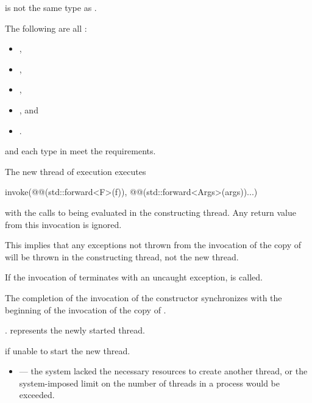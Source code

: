 \begin{itemdescr}
\pnum
\constraints
{} is not the same type as .

\pnum
\mandates
The following are all :
\begin{itemize}
\item {},
\item {},
\item {},
\item {}, and
\item {}.
\end{itemize}

\pnum
\expects
{} and each type in  meet the
 requirements.

\pnum
\effects
The new thread of execution executes
\begin{codeblock}
invoke(@@(std::forward<F>(f)), @@(std::forward<Args>(args))...)
\end{codeblock}
with the calls to
 being evaluated in the constructing thread.
Any return value from this invocation is ignored.
\begin{note}
This implies that any exceptions not thrown from the invocation of the copy
of  will be thrown in the constructing thread, not the new thread.
\end{note}
If the invocation of  terminates with an uncaught exception,
 is called.

\pnum
\sync
The completion of the invocation of the constructor
synchronizes with the beginning of the invocation of the copy of .

\pnum
\ensures
{}.  represents the newly started thread.

\pnum
\throws
{} if unable to start the new thread.

\pnum
\errors
\begin{itemize}
\item {} --- the system lacked the necessary
resources to create another thread, or the system-imposed limit on the number of
threads in a process would be exceeded.
\end{itemize}
\end{itemdescr}

